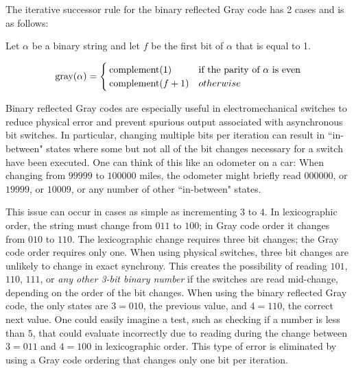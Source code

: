The iterative successor rule for the binary reflected Gray code has 2 cases and is as follows:


Let $\alpha$ be a binary string and let $f$ be the first bit of $\alpha$ that is equal to 1.

\begin{equation} \label{eq:BRGC-rule}
    \text{gray}(\alpha) = \begin{cases} 
        \operatorname{complement}(1) & \text{if the parity of $\alpha$ is even}\\
        \operatorname{complement}(f+1) & otherwise\\
\end{cases}
\end{equation}

Binary reflected Gray codes are especially useful in electromechanical switches to reduce physical error and prevent spurious output associated with asynchronous bit switches.  In particular, changing multiple bits per iteration can result in ``in-between" states where some but not all of the bit changes necessary for a switch have been executed.  One can think of this like an odometer on a car: When changing from $99999$ to $100000$ miles, the odometer might briefly read $000000$, or $19999$, or $10009$, or any number of other ``in-between" states. 

This issue can occur in cases as simple as incrementing $3$ to $4$.  In lexicographic order, the string must change from $011$ to $100$; in Gray code order it changes from $010$ to $110$.  The lexicographic change requires three bit changes; the Gray code order requires only one.  When using physical switches, three bit changes are unlikely to change in exact synchrony.  This creates the possibility of reading $101$, $110$, $111$, or \emph{any other 3-bit binary number} if the switches are read mid-change, depending on the order of the bit changes.  When using the binary reflected Gray code, the only states are $3=010$, the previous value, and $4=110$, the correct next value. One could easily imagine a test, such as checking if a number is less than $5$, that could evaluate incorrectly due to reading during the change between $3=011$ and $4=100$ in lexicographic order.  This type of error is eliminated by using a Gray code ordering that changes only one bit per iteration.


